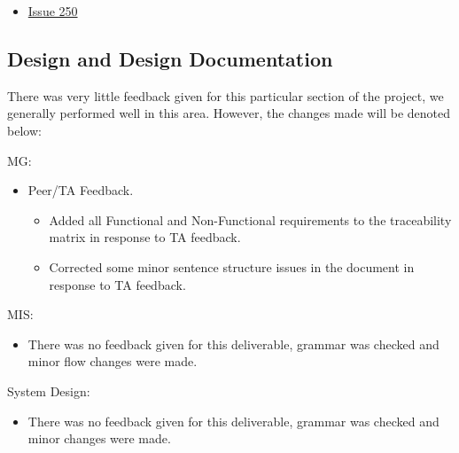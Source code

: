 \documentclass{article}
\begin{document}
\begin{itemize}
    \item \href{https://github.com/davimang/REACH/issues/250}{Issue 250}
\end{itemize}


\subsection{Design and Design Documentation}
There was very little feedback given for this particular section of the project, 
we generally performed well in this area. However, the changes made will be denoted below: \newline

\noindent MG: 
\begin{itemize}
	\item Peer/TA Feedback.
	\begin{itemize}
        \item Added all Functional and Non-Functional requirements to the traceability matrix in response to TA feedback.
        \item Corrected some minor sentence structure issues in the document in response to TA feedback.
    \end{itemize}
\end{itemize}


MIS:
\begin{itemize}
    \item There was no feedback given for this deliverable, grammar was checked and minor flow changes were made. \newline
\end{itemize}


System Design:
\begin{itemize}
    \item There was no feedback given for this deliverable, grammar was checked and minor changes were made. \newline
\end{itemize}
\end{document}
